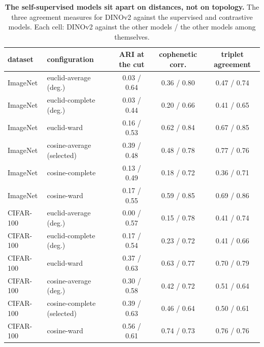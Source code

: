 \begin{table}[H]
\centering
\scriptsize
\setlength{\tabcolsep}{3pt}
\begingroup
\setlength{\tabcolsep}{3pt}
\begin{tabular}{ll|ccc}
\toprule
dataset & configuration & ARI at the cut & cophenetic corr. & triplet agreement \\
\midrule
ImageNet & euclid-average (deg.) & 0.03 / 0.64 & 0.36 / 0.80 & 0.47 / 0.74 \\
ImageNet & euclid-complete (deg.) & 0.03 / 0.44 & 0.20 / 0.66 & 0.41 / 0.65 \\
ImageNet & euclid-ward & 0.16 / 0.53 & 0.62 / 0.84 & 0.67 / 0.85 \\
ImageNet & cosine-average (selected) & 0.39 / 0.48 & 0.48 / 0.78 & 0.77 / 0.76 \\
ImageNet & cosine-complete & 0.13 / 0.49 & 0.18 / 0.72 & 0.36 / 0.71 \\
ImageNet & cosine-ward & 0.17 / 0.55 & 0.59 / 0.85 & 0.69 / 0.86 \\
\midrule
CIFAR-100 & euclid-average (deg.) & 0.00 / 0.57 & 0.15 / 0.78 & 0.41 / 0.74 \\
CIFAR-100 & euclid-complete (deg.) & 0.17 / 0.54 & 0.23 / 0.72 & 0.41 / 0.66 \\
CIFAR-100 & euclid-ward & 0.37 / 0.63 & 0.63 / 0.77 & 0.70 / 0.79 \\
CIFAR-100 & cosine-average (deg.) & 0.30 / 0.58 & 0.42 / 0.72 & 0.51 / 0.64 \\
CIFAR-100 & cosine-complete (selected) & 0.39 / 0.63 & 0.46 / 0.64 & 0.50 / 0.61 \\
CIFAR-100 & cosine-ward & 0.56 / 0.61 & 0.74 / 0.73 & 0.76 / 0.76 \\
\bottomrule
\end{tabular}
\par\vspace{2pt}
\endgroup
\caption{\textbf{The self-supervised models sit apart on distances, not on topology.} The three agreement measures for DINOv2 against the supervised and contrastive models. Each cell: DINOv2 against the other models / the other models among themselves.
}
\label{tab:q6-treemap}\label{tab:q6-treemap-b}
\end{table}
